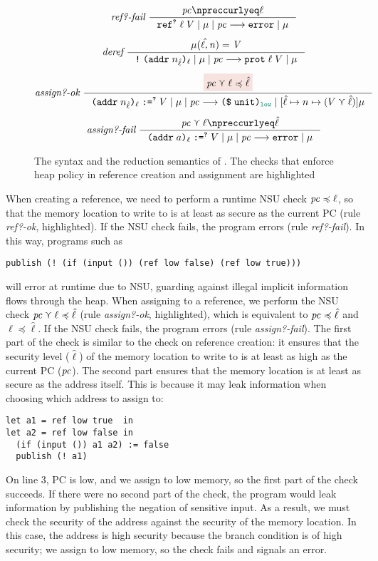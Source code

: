\begin{figure}[tbp]
{\begin{gather*}
  \\[1ex]
  \textit{ref?-fail}~
  \inference
  {\pc \npreccurlyeq \ell}
  {\reduce{\dynref{?}{\ell}{V}}{\mu}{\pc}{\key{error}}{\mu}}
  \\[1ex]
  \textit{deref}~
  \inference
  {\mathit{\mu(\hat{\ell},n) = V}}
  {\reduce{\dynderef{\dynaddr{n_{\hat{\ell}}}{\ell}}}{\mu}{\pc}{\dynprot{\ell}{V}}{\mu}}
  \\[1ex]
  \textit{assign?-ok}~
  \inference
  {\highlightred{\pc \curlyvee \ell \preccurlyeq \hat{\ell}}}
  {\reduce{\dynassign{\dynaddr{n_{\hat{\ell}}}{\ell}}{?}{V}}{\mu}{\pc}{\dynconst{\unit}{\low}}{[\hat{\ell} \mapsto n \mapsto (V \curlyvee \hat{\ell})] \mu}}
  \\[1ex]
  \textit{assign?-fail}~
  \inference
  {\pc \curlyvee \ell \npreccurlyeq \hat{\ell}}
  {\reduce{\dynassign{\dynaddr{a}{\ell}}{?}{V}}{\mu}{\pc}{\key{error}}{\mu}}
  \end{gather*}}
  \caption{The syntax and the reduction semantics of \DynIFC. The checks that
    enforce heap policy in reference creation and assignment are highlighted}
  \label{fig:dyn-ifc}
\end{figure}

When creating a reference, we need to perform a runtime NSU check $\mathit{pc}
\preccurlyeq \ell$, so that the memory location to write to is at least as
secure as the current PC (rule \textit{ref?-ok}, highlighted). If the NSU check
fails, the program errors (rule \textit{ref?-fail}). In this way, programs such
as
\begin{lstlisting}[style=tt,numbers=none]
publish (! (if (input ()) (ref low false) (ref low true)))
\end{lstlisting}
will error at runtime due to NSU, guarding against illegal implicit information
flows through the heap. When assigning to a reference, we perform the NSU check
$\mathit{pc} \curlyvee \ell \preccurlyeq \hat{\ell}$ (rule \textit{assign?-ok},
highlighted), which is equivalent to $\mathit{pc} \preccurlyeq \hat{\ell}$ and $\ell
\preccurlyeq \hat{\ell}$. If the NSU check fails, the program errors (rule
\textit{assign?-fail}). The first part of the check is similar to the check on
reference creation: it ensures that the security level ($\hat{\ell}$) of the
memory location to write to is at least as high as the current PC ($\mathit{pc}$). The
second part ensures that the memory location is at least as secure as the
address itself. This is because it may leak information when choosing which
address to assign to:
\begin{lstlisting}[style=tt]
let a1 = ref low true  in
let a2 = ref low false in
  (if (input ()) a1 a2) := false
  publish (! a1)
\end{lstlisting}
\noindent On line 3, PC is low, and we assign to low memory, so the first part of the
check succeeds. If there were no second part of the check, the program would
leak information by publishing the negation of sensitive input. As a result, we
must check the security of the address against the security of the memory
location. In this case, the address is high security because the branch
condition is of high security; we assign to low memory, so the check fails and
signals an error.

